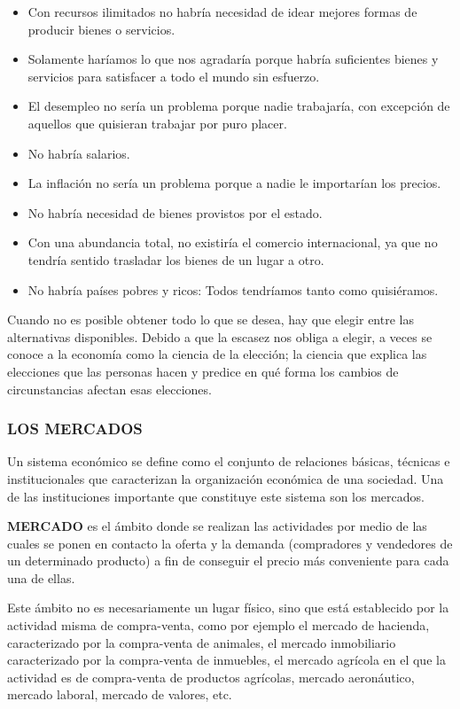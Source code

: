 \begin{itemize}
  \item Con recursos ilimitados no habría necesidad de idear mejores formas de producir bienes o servicios.
  \item Solamente haríamos lo que nos agradaría porque habría suficientes bienes y servicios para satisfacer a todo el mundo sin esfuerzo.
  \item El desempleo no sería un problema porque nadie trabajaría, con excepción de aquellos que quisieran trabajar por puro placer.
  \item No habría salarios.
  \item La inflación no sería un problema porque a nadie le importarían los precios.
  \item No habría necesidad de bienes provistos por el estado.
  \item Con una abundancia total, no existiría el comercio internacional, ya que no tendría sentido trasladar los bienes de un lugar a otro.
  \item No habría países pobres y ricos: Todos tendríamos tanto como quisiéramos.
\end{itemize}
Cuando no es posible obtener todo lo que se desea, hay que elegir entre las alternativas disponibles. Debido a que la escasez nos obliga a elegir, a veces se conoce a la economía como la ciencia de la elección; la ciencia que explica las elecciones que las personas hacen y predice en qué forma los cambios de circunstancias afectan esas elecciones.

\subsubsection*{LOS MERCADOS}
Un sistema económico se define como el conjunto de relaciones básicas, técnicas e institucionales que caracterizan la organización económica de una sociedad. Una de las instituciones importante que constituye este sistema son los mercados.


\begin{recuadro}
\textbf{MERCADO }es el ámbito donde se realizan las actividades por medio de las cuales se ponen en contacto la oferta y la demanda (compradores y vendedores de un determinado producto) a fin de conseguir el precio más conveniente para cada una de ellas.
\end{recuadro}

Este ámbito no es necesariamente un lugar físico, sino que está establecido por la actividad misma de compra-venta, como por ejemplo el mercado de hacienda, caracterizado por la compra-venta de animales, el mercado inmobiliario caracterizado por la compra-venta de inmuebles, el mercado agrícola en el que la actividad es de compra-venta de productos agrícolas, mercado aeronáutico, mercado laboral, mercado de valores, etc.

